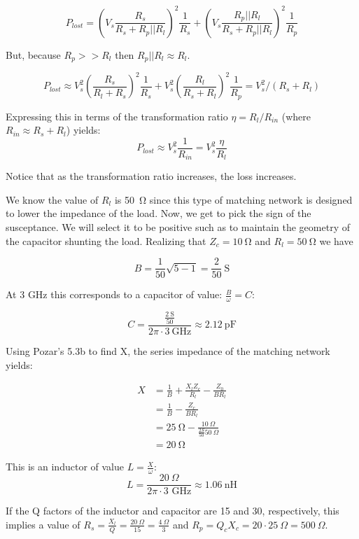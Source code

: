 \[ 
        P_{lost} = \left( V_s \frac{R_s}{R_s + R_p||R_l} \right)^2 \frac{1}{R_s}
        + \left( V_s \frac{R_p || R_l}{R_s + R_p ||R_l} \right)^2 \frac{1}{R_p}
\]

But, because $R_p >> R_l$ then $R_p || R_l \approx R_l$.

\[ 
        P_{lost} \approx V_s^2 \left( \frac{R_s}{R_l + R_s} \right)^2
        \frac{1}{R_s} + V_s^2 \left( \frac{R_l}{R_s+R_l} \right)^2
        \frac{1}{R_p} = V_s^2 / \left( R_s +R_l \right)
\]

Expressing this in terms of the transformation ratio $ \eta = R_l/R_{in}$ (where $R_{in}
\approx R_s + R_l$) yields:
\[ 
        P_{lost} \approx V_s^2 \frac{1}{R_{in}} = V_s^2 \frac{\eta}{R_l} 
\]

Notice that as the transformation ratio increases, the loss increases.

We know the value of $R_l$ is \SI{50}{\ohm} since this type of matching network
is designed to lower the impedance of the load. Now, we get to pick the sign of
the susceptance. We will select it to be positive such as to maintain the
geometry of the capacitor shunting the load. Realizing that $Z_c =
\SI{10}{\ohm}$ and $R_l = \SI{50}{\ohm}$ we have

\[ 
        B =\frac{1}{50} \sqrt{5-1} = \frac{2}{50}~\text{S}
\]

At 3 GHz this corresponds to a capacitor of value: $\frac{B}{\omega} = C$:

\[ 
        C = \frac{\frac{2~\text{S}}{50}}{2\pi \cdot 3~\text{GHz}} \approx
        \SI{2.12}{\pico\farad}
\]

Using Pozar's 5.3b to find X, the series impedance of the matching network
yields:

\begin{align*}
    X &= \frac{1}{B} + \frac{X_l Z_c}{R_l} - \frac{Z_0}{B R_l} \\
    &= \frac{1}{B} - \frac{Z_c}{B R_l} \\
    &= \SI{25}{\ohm} - \frac{10~\Omega}{\frac{2S}{50}50~\Omega} \\
    &= \SI{20}{\ohm}
\end{align*}

This is an inductor of value $L = \frac{X}{\omega}$:
\[ 
        L = \frac{20~\Omega}{2\pi \cdot 3 \text{~GHz}} \approx
        \SI{1.06}{\nano\henry}
\]

If the Q factors of the inductor and capacitor are 15 and 30, respectively, this
implies a value of $R_s = \frac{X_l}{Q} = \frac{20~\Omega}{15} =
\frac{4~\Omega}{3}$ and $R_p = Q_c X_c = 20 \cdot 25~\Omega = 500~\Omega$. 

